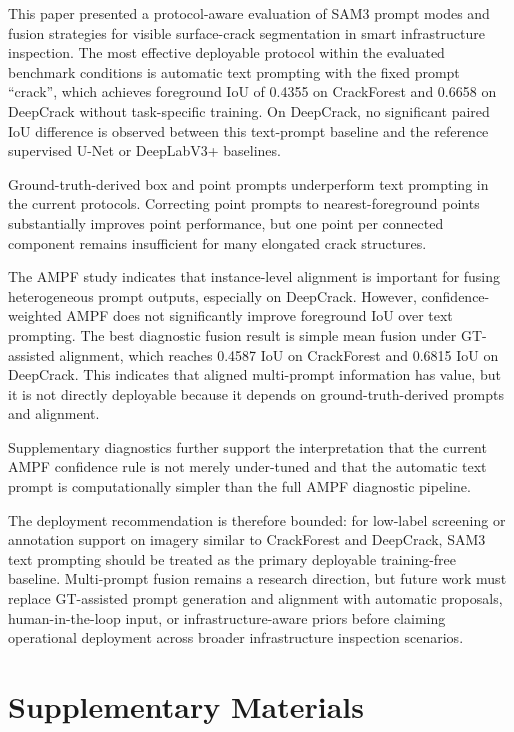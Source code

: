\documentclass[applsci,article,submit,pdftex,moreauthors]{Definitions/mdpi}
\begin{document}
This paper presented a protocol-aware evaluation of SAM3 prompt modes
and fusion strategies for visible surface-crack segmentation in smart
infrastructure inspection. The most effective deployable protocol within
the evaluated benchmark conditions is automatic text prompting with the
fixed prompt ``crack'', which achieves foreground IoU of 0.4355 on
CrackForest and 0.6658 on DeepCrack without task-specific training. On
DeepCrack, no significant paired IoU difference is observed between this
text-prompt baseline and the reference supervised U-Net or DeepLabV3+
baselines.

Ground-truth-derived box and point prompts underperform text prompting
in the current protocols. Correcting point prompts to nearest-foreground
points substantially improves point performance, but one point per
connected component remains insufficient for many elongated crack
structures.

The AMPF study indicates that instance-level alignment is important for
fusing heterogeneous prompt outputs, especially on DeepCrack. However,
confidence-weighted AMPF does not significantly improve foreground IoU
over text prompting. The best diagnostic fusion result is simple mean
fusion under GT-assisted alignment, which reaches 0.4587 IoU on
CrackForest and 0.6815 IoU on DeepCrack. This indicates that aligned
multi-prompt information has value, but it is not directly deployable
because it depends on ground-truth-derived prompts and alignment.

Supplementary diagnostics further support the interpretation that the
current AMPF confidence rule is not merely under-tuned and that the
automatic text prompt is computationally simpler than the full AMPF
diagnostic pipeline.

The deployment recommendation is therefore bounded: for low-label
screening or annotation support on imagery similar to CrackForest and
DeepCrack, SAM3 text prompting should be treated as the primary
deployable training-free baseline. Multi-prompt fusion remains a
research direction, but future work must replace GT-assisted prompt
generation and alignment with automatic proposals, human-in-the-loop
input, or infrastructure-aware priors before claiming operational
deployment across broader infrastructure inspection scenarios.

\section{Supplementary Materials}
\end{document}
